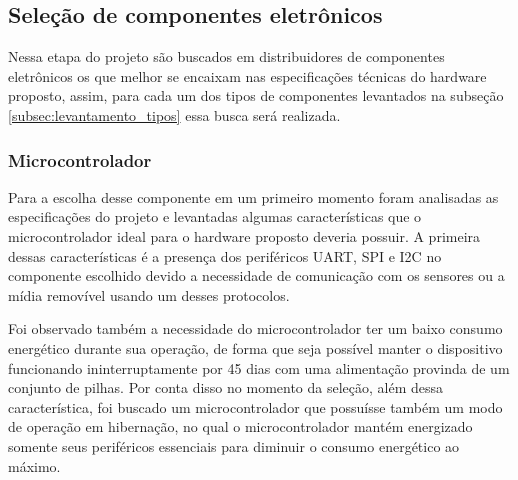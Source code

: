 \subsection{Seleção de componentes eletrônicos}

Nessa etapa do projeto são buscados em distribuidores de componentes eletrônicos os que melhor se encaixam nas especificações técnicas do hardware proposto, assim, para cada um dos tipos de componentes levantados na subseção \ref{subsec:levantamento_tipos} essa busca será realizada. 



\subsubsection{Microcontrolador}\label{subsubsec:esp32_modulo}


Para a escolha desse componente em um primeiro momento foram analisadas as especificações do projeto e levantadas algumas características que o microcontrolador ideal para o hardware proposto deveria possuir. A primeira dessas características é a presença dos periféricos UART, SPI e I2C no componente escolhido devido a necessidade de comunicação com os sensores ou a mídia removível usando um desses protocolos.

Foi observado também a necessidade do microcontrolador ter um baixo consumo energético durante sua operação, de forma que seja possível manter o dispositivo funcionando ininterruptamente por 45 dias com uma alimentação provinda de um conjunto de pilhas. Por conta disso no momento da seleção, além dessa característica, foi buscado um microcontrolador que possuísse também um modo de operação em hibernação, no qual o microcontrolador mantém energizado somente seus periféricos essenciais para diminuir o consumo energético ao máximo. 

